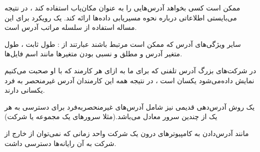 \begin{boxK}
ممکن است کسی بخواهد آدرس‌هایی را به عنوان مکان‌یاب استفاده کند ، در نتیجه می‌بایستی اطلاعاتی درباره نحوه مسیریابی داده‌ها ارائه کند. 
یک رویکرد برای این مساله استفاده از سلسله مراتب آدرس است.


 سایر ویژگی‌های آدرس که ممکن است مرتبط باشند عبارتند از : 
 طول ثابت ، طول متغیر 
 آدرس
 و مطلق و نسبی بودن متغیرها مانند اسم فایل‌ها.

    در شرکت‌های بزرگ آدرس تلفنی که برای ما به ازای هر کارمند که با او صحبت می‌کنیم نمایش داده‌می‌شود یکسان است ، در نتیجه همه این کارمندان آدرس غیرمنحصر به فرد یکسانی دارند.

    یک روش آدرس‌دهی قدیمی نیز شامل آدرس‌های غیرمنحصربه‌فرد برای دسترسی به هر یک از چندین سرور معادل می‌باشد.(مثلا سرورهای یک مجموعه یا شرکت)

    مانند آدرس‌دادن به کامپیوترهای درون یک شرکت واحد زمانی که نمی‌توان از خارج از شرکت به آن رایانه‌ها دسترسی داشت.
\end{boxK}
    